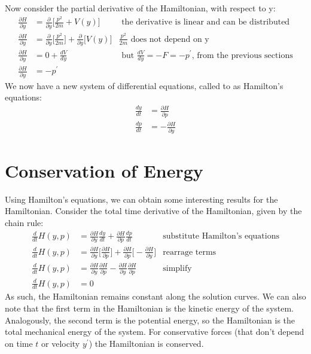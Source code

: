 \documentclass[12pt]{article}
\begin{document}
	\indent Now consider the partial derivative of the Hamiltonian, with respect to y:
	\begin{align*}
	\frac{\partial H}{\partial y}&=\frac{\partial}{\partial y}\bigg[\frac{p^2}{2m}+V(y)\bigg] &\text{ the derivative is linear and can be distributed}
	\\
	\frac{\partial H}{\partial y}&=\frac{\partial}{\partial y}\bigg[\frac{p^2}{2m}\bigg]+\frac{\partial}{\partial y}\bigg[V(y)\bigg] &\text{$\frac{p^2}{2m}$ does not depend on y}
	\\
	\frac{\partial H}{\partial y}&=0+\frac{dV}{dy} &\text{ but $\frac{dV}{dy}=-F=-p^\prime$, from the previous sections}
	\\
	\frac{\partial H}{\partial y}&=-p^\prime
	\end{align*}
	\indent We now have a new system of differential equations, called to as Hamilton's equations:
	\begin{align*}
	\frac{dy}{dt}&=\frac{\partial H}{\partial p} 
	\\
	\frac{dp}{dt}&=-\frac{\partial H}{\partial y} 
	\end{align*}
	
	\clearpage
	
	\section{Conservation of Energy}
	
	\indent \indent Using Hamilton's equations, we can obtain some interesting results for the Hamiltonian. Consider the total time derivative of the Hamiltonian, given by the chain rule:
	\begin{align*}
	\frac{d}{dt}H(y,p)&=\frac{\partial H}{\partial y}\frac{dy}{dt}+\frac{\partial H}{\partial p}\frac{dp}{dt} &\text{substitute Hamilton's equations}
	\\
	\frac{d}{dt}H(y,p)&=\frac{\partial H}{\partial y}\bigg[\frac{\partial H}{\partial p}\bigg]+\frac{\partial H}{\partial p}\bigg[-\frac{\partial H}{\partial y}\bigg] &\text{rearrage terms}
	\\
	\frac{d}{dt}H(y,p)&=\frac{\partial H}{\partial y}\frac{\partial H}{\partial p} - \frac{\partial H}{\partial y}\frac{\partial H}{\partial p} &\text{simplify}
	\\
	\frac{d}{dt}H(y,p)&=0
	\end{align*}
	\indent As such, the Hamiltonian remains constant along the solution curves. We can also note that the first term in the Hamiltonian is the kinetic energy of the system. Analogously, the second term is the potential energy, so the Hamiltonian is the total mechanical energy of the system. For conservative forces (that don't depend on time $t$ or velocity $y^\prime$) the Hamiltonian is conserved.
	
\end{document}
